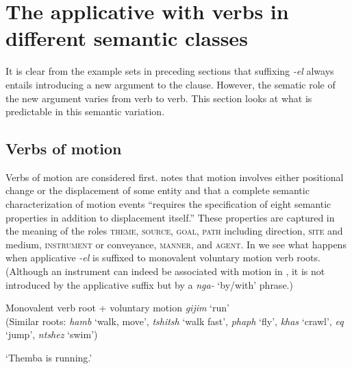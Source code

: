 \documentclass[output=paper]{langsci/langscibook}
\begin{document}
\section{The applicative with verbs in different semantic classes}\label{sec:sibanda:4}

It is clear from the example sets in preceding sections that suffixing \textit{-el} always entails introducing a new argument to the clause. However, the sematic role of the new argument varies from verb to verb. This section looks at what is predictable in this semantic variation.

\subsection{Verbs of motion} \label{sec:sibanda:4.1}

Verbs of motion are considered first. \citet[171]{Frawley1992} notes that motion involves either positional change or the displacement of some entity and that a complete semantic characterization of motion events “requires the specification of eight semantic properties in addition to displacement itself.” These properties are captured in the meaning of the roles \textsc{theme}, \textsc{source}, \textsc{goal}, \textsc{path} including direction, \textsc{site} and medium, \textsc{instrument} or conveyance, \textsc{manner}, and \textsc{agent}. In  we see what happens when applicative \textit{-el} is suffixed to monovalent voluntary motion verb roots. (Although an instrument can indeed be associated with motion in , it is not introduced by the applicative suffix but by a \textit{nga-} ‘by/with’ phrase.)

\ea\label{ex:sibanda:5}
\settowidth{}
{Monovalent verb root + voluntary motion \textit{gijim} ‘run’}\\
 (Similar roots: \textit{hamb} ‘walk, move’, \textit{tshitsh} ‘walk fast’, \textit{phaph} ‘fly’, \textit{khas} ‘crawl’, \textit{eq} ‘jump’, \textit{ntshez} ‘swim’)\\
 

\glt ‘Themba is running.’

\end{document}
